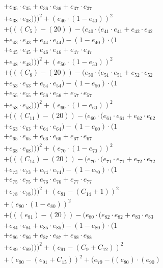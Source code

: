 \documentclass[10pt, a4paper]{article}
\begin{document}
\begin{small}
\begin{align*}
& + e_{35} \cdot e_{35} + e_{36} \cdot e_{36} + e_{37} \cdot e_{37} \\
& + e_{38} \cdot e_{38})))^{2} + (e_{40} \cdot (1 - e_{40}))^{2} \\
& + (((C_{5}) - (20)) - (e_{40} \cdot (e_{41} \cdot e_{41} + e_{42} \cdot e_{42} \\
& + e_{43} \cdot e_{43} + e_{44} \cdot e_{44}) - (1 - e_{40}) \cdot (1 \\
& + e_{45} \cdot e_{45} + e_{46} \cdot e_{46} + e_{47} \cdot e_{47} \\
& + e_{48} \cdot e_{48})))^{2} + (e_{50} \cdot (1 - e_{50}))^{2} \\
& + (((C_{8}) - (20)) - (e_{50} \cdot (e_{51} \cdot e_{51} + e_{52} \cdot e_{52} \\
& + e_{53} \cdot e_{53} + e_{54} \cdot e_{54}) - (1 - e_{50}) \cdot (1 \\
& + e_{55} \cdot e_{55} + e_{56} \cdot e_{56} + e_{57} \cdot e_{57} \\
& + e_{58} \cdot e_{58})))^{2} + (e_{60} \cdot (1 - e_{60}))^{2} \\
& + (((C_{11}) - (20)) - (e_{60} \cdot (e_{61} \cdot e_{61} + e_{62} \cdot e_{62} \\
& + e_{63} \cdot e_{63} + e_{64} \cdot e_{64}) - (1 - e_{60}) \cdot (1 \\
& + e_{65} \cdot e_{65} + e_{66} \cdot e_{66} + e_{67} \cdot e_{67} \\
& + e_{68} \cdot e_{68})))^{2} + (e_{70} \cdot (1 - e_{70}))^{2} \\
& + (((C_{14}) - (20)) - (e_{70} \cdot (e_{71} \cdot e_{71} + e_{72} \cdot e_{72} \\
& + e_{73} \cdot e_{73} + e_{74} \cdot e_{74}) - (1 - e_{70}) \cdot (1 \\
& + e_{75} \cdot e_{75} + e_{76} \cdot e_{76} + e_{77} \cdot e_{77} \\
& + e_{78} \cdot e_{78})))^{2} + (e_{81} - (C_{14} + 1))^{2} \\
& + (e_{80} \cdot (1 - e_{80}))^{2} \\
& + (((e_{81}) - (20)) - (e_{80} \cdot (e_{82} \cdot e_{82} + e_{83} \cdot e_{83} \\
& + e_{84} \cdot e_{84} + e_{85} \cdot e_{85}) - (1 - e_{80}) \cdot (1 \\
& + e_{86} \cdot e_{86} + e_{87} \cdot e_{87} + e_{88} \cdot e_{88} \\
& + e_{89} \cdot e_{89})))^{2} + (e_{91} - (C_{9} + C_{12}))^{2} \\
& + (e_{90} - (e_{91} + C_{15}))^{2} + (e_{79} - ((e_{80})  \cdot  (e_{90}) \\

\end{align*}
\end{small}
\end{document}
